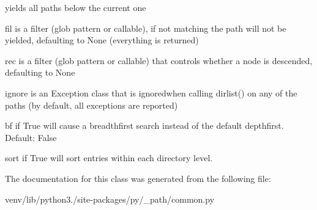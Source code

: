 \begin{DoxyVerb}yields all paths below the current one

    fil is a filter (glob pattern or callable), if not matching the
    path will not be yielded, defaulting to None (everything is
    returned)

    rec is a filter (glob pattern or callable) that controls whether
    a node is descended, defaulting to None

    ignore is an Exception class that is ignoredwhen calling dirlist()
    on any of the paths (by default, all exceptions are reported)

    bf if True will cause a breadthfirst search instead of the
    default depthfirst. Default: False

    sort if True will sort entries within each directory level.
\end{DoxyVerb}
 

The documentation for this class was generated from the following file\+:\begin{DoxyCompactItemize}
\item 
venv/lib/python3./site-\/packages/py/\+\_\+path/common.\+py\end{DoxyCompactItemize}
